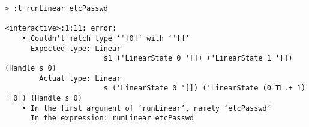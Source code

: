 \begin{repl}\begin{lstlisting}
> :t runLinear etcPasswd

<interactive>:1:11: error:
    • Couldn't match type ‘'[0]’ with ‘'[]’
      Expected type: Linear
                       s1 ('LinearState 0 '[]) ('LinearState 1 '[]) (Handle s 0)
        Actual type: Linear
                       s ('LinearState 0 '[]) ('LinearState (0 TL.+ 1) '[0]) (Handle s 0)
    • In the first argument of ‘runLinear’, namely ‘etcPasswd’
      In the expression: runLinear etcPasswd\end{lstlisting}\end{repl}
